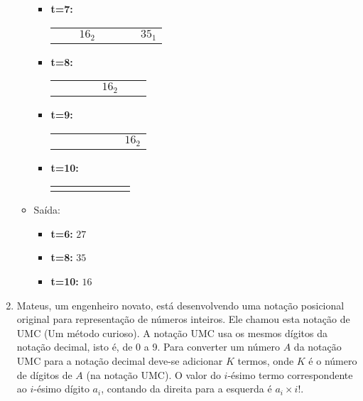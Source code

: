 \begin{enumerate}
\begin{itemize}
\begin{itemize}
        \item \textbf{t=7:} \begin{tabular}{|p{1cm}|p{1cm}|p{1cm}|p{1cm}|p{1cm}|p{1cm}|p{1cm}|}
            \hline & & & & & &\\ 
            \hline & &$16_2$ & & & & $35_1$ \\ \hline \end{tabular} 
        \item \textbf{t=8:} \begin{tabular}{|p{1cm}|p{1cm}|p{1cm}|p{1cm}|p{1cm}|p{1cm}|p{1cm}|}
            \hline & & & & & &\\ 
            \hline & & & & $16_2$& &  \\ \hline \end{tabular}
        \item \textbf{t=9:} \begin{tabular}{|p{1cm}|p{1cm}|p{1cm}|p{1cm}|p{1cm}|p{1cm}|p{1cm}|}
            \hline & & & & & &\\ 
            \hline & & & & & & $16_2$ \\ \hline \end{tabular}
        \item \textbf{t=10:} \begin{tabular}{|p{1cm}|p{1cm}|p{1cm}|p{1cm}|p{1cm}|p{1cm}|p{1cm}|}
            \hline & & & & & &\\ 
            \hline & & & & & & \\ \hline \end{tabular}
    \end{itemize}
    \item Saída:
    \begin{itemize}
        \item \textbf{t=6:} $27$
        \item \textbf{t=8:} $35$
        \item \textbf{t=10:} $16$
    \end{itemize}
\end{itemize}


\item Mateus, um engenheiro novato, está desenvolvendo uma notação posicional original
para representação de números inteiros. Ele chamou esta notação de UMC 
(Um método curioso). A notação UMC usa os mesmos dígitos da notação decimal,
isto é, de 0 a 9.
%
Para converter um número $A$ da notação UMC para a notação decimal deve-se
adicionar $K$ termos, onde $K$ é o número de dígitos de $A$ (na notação UMC).
O valor do $i$-ésimo termo correspondente ao $i$-ésimo dígito $a_i$, contando
da direita para a esquerda é $a_i \times i!$. 


\end{enumerate}
